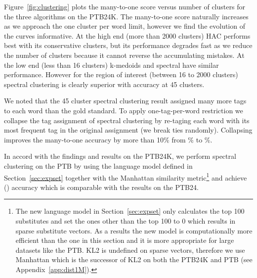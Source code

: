 Figure~\ref{fig:clustering} plots the many-to-one score versus number
of clusters for the three algorithms on the PTB24K.  The many-to-one
score naturally increases as we approach the one cluster per word
limit, however we find the evolution of the curves informative.  At
the high end (more than 2000 clusters) HAC performs best with its
conservative clusters, but its performance degrades fast as we reduce
the number of clusters because it cannot reverse the accumulating
mistakes.  At the low end (less than 16 clusters) k-medoids and
spectral have similar performance.  However for the region of interest
(between 16 to 2000 clusters) spectral clustering is clearly superior
with \spectralResult \mto accuracy at 45 clusters.

We noted that the 45 cluster spectral clustering result assigned many
more tags to each word than the gold standard.  To apply
one-tag-per-word restriction we collapse the tag assignment of
spectral clustering by re-taging each word with its most frequent tag
in the original assignment (we break ties randomly).  Collapsing
improves the many-to-one accuracy by more than 10\% from
\spectralResult\% to \collapseResult\%.

In accord with the findings and results on the PTB24K, we perform
spectral clustering on the PTB by using the language model defined in
Section~\ref{sec:expset} together with the Manhattan similarity
metric\footnote{The new language model in Section~\ref{sec:expset} only
  calculates the top 100 substitutes and set the ones other than the
  top 100 to 0 which results in sparse substitute vectors.  As a
  results the new model is computationally more efficient than the one
  in this section and it is more appropriate for large datasets like
  the PTB.  KL2 is undefined on sparse vectors, therefore we use
  Manhattan which is the successor of KL2 on both the PTB24K and PTB
  (see Appendix~\ref{app:dist1M}).}  and achieve \spectralResultPTB
\mto (\collapseResultPTB \vm) accuracy which is comparable with the
results on the PTB24.



